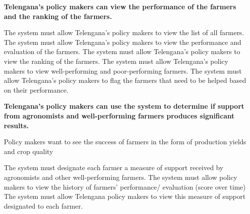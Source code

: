 \begin{itemize}
 \textbf{Telengana’s policy makers can view the performance of the farmers and the ranking of the farmers. }
\begin{itemize}
 The system must allow Telengana’s policy makers to view the list of all farmers.
 The system must allow Telengana’s policy makers to view the performance and evaluation of the farmers.
 The system must allow Telengana’s policy makers to view the ranking of the farmers.
 The system must allow Telengana’s policy makers to view well-performing and poor-performing farmers.
 The system must allow Telengana’s policy makers to flag the farmers that need to be helped based on their performance.
\end{itemize}

 \textbf{Telengana’s policy makers can use the system to determine if support from agronomists and well-performing farmers produces significant results.}

\begin{itemize}
 Policy makers want to see the success of farmers in the form of production yields and crop quality

 The system must designate each farmer a measure of support received by agronomists and other well-performing farmers.
 The system must allow policy makers to view the history of farmers’ performance/ evaluation (score over time)
 The system must allow Telengana policy makers to view this measure of support designated to each farmer.
\end{itemize}



\end{itemize}
